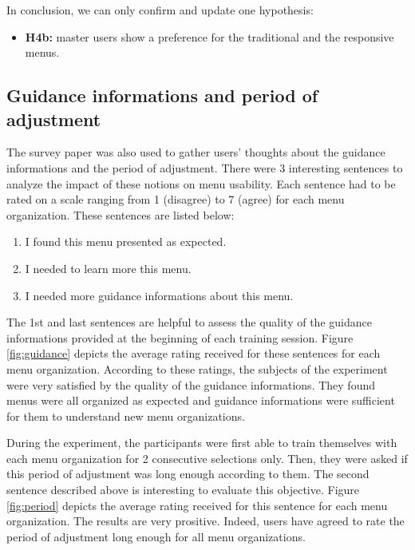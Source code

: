 In conclusion, we can only confirm and update one hypothesis:

\begin{itemize}
 \item \textbf{H4b:} master users show a preference for the traditional and 
the responsive menus.
\end{itemize}

\subsection{Guidance informations and period of adjustment}
The survey paper was also used to gather users' thoughts about the guidance 
informations and the period of adjustment. There were 3 interesting sentences 
to analyze the impact of these notions on menu usability. Each sentence had to 
be rated on a scale ranging from 1 (disagree) to 7 (agree) for each menu 
organization. These sentences are listed below:

\begin{enumerate}
 \item I found this menu presented as expected.
 \item I needed to learn more this menu.
 \item I needed more guidance informations about this menu.
\end{enumerate}

The 1st and last sentences are helpful to assess the quality of the guidance 
informations provided at the beginning of each training session. Figure 
\ref{fig:guidance} depicts the average rating received for these sentences for 
each menu organization. According to these ratings, the subjects of the 
experiment were very satisfied by the quality of the guidance informations. 
They found menus were all organized as expected and guidance informations were 
sufficient for them to understand new menu organizations.\newline

During the experiment, the participants were first able to train themselves 
with each menu organization for 2 consecutive selections only. Then, they were 
asked if this period of adjustment was long enough according to them. The 
second sentence described above is interesting to evaluate this objective. 
Figure \ref{fig:period} depicts the average rating received for this sentence 
for each menu organization. The results are very prositive. Indeed, users have 
agreed to rate the period of adjustment long enough for all menu 
organizations.\newline

